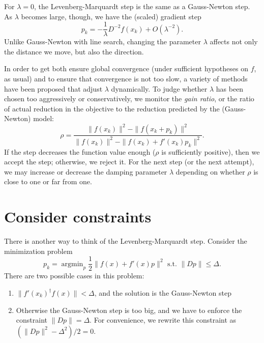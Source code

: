 \documentclass[12pt, leqno]{article} %
\begin{document}
For $\lambda = 0$, the Levenberg-Marquardt step is the same as
a Gauss-Newton step.  As $\lambda$ becomes large, though, we have
the (scaled) gradient step
\[
  p_k = -\frac{1}{\lambda} D^{-2} f(x_k) + O(\lambda^{-2}).
\]
Unlike Gauss-Newton with line search, changing the parameter $\lambda$
affects not only the distance we move, but also the direction.

In order to get both ensure global convergence (under sufficient
hypotheses on $f$, as usual) and to ensure that convergence is not
too slow, a variety of methods have been proposed that adjust
$\lambda$ dynamically.  To judge whether $\lambda$ has been chosen
too aggressively or conservatively, we monitor the {\em gain ratio}, or the
ratio of actual reduction in the objective to the reduction predicted
by the (Gauss-Newton) model:
\[
  \rho =
  \frac{\|f(x_k)\|^2-\|f(x_k+p_k)\|^2}
       {\|f(x_k)\|^2 - \|f(x_k)+f'(x_k)p_k\|^2}.
\]
If the step decreases the function value enough ($\rho$ is
sufficiently positive), then we accept the step; otherwise,
we reject it.  For the next step (or the next attempt), we
may increase or decrease the damping parameter $\lambda$
depending on whether $\rho$ is close to one or far from one.

\section{Consider constraints}

There is another way to think of the Levenberg-Marquardt step.
Consider the minimization problem
\[
  p_k = \operatorname{argmin}_p \frac{1}{2} \|f(x) + f'(x)p \|^2 \mbox{ s.t.~}
  \|Dp\| \leq \Delta.
\]
There are two possible cases in this problem:
\begin{enumerate}
\item $\|f'(x_k)^\dagger f(x)\| < \Delta$, and the solution is the
  Gauss-Newton step
\item Otherwise the Gauss-Newton step is too big, and we have to
  enforce the constraint $\|Dp\| = \Delta$.  For convenience, we
  rewrite this constraint as $(\|Dp\|^2-\Delta^2)/2 = 0$.
\end{enumerate}
\end{document}
